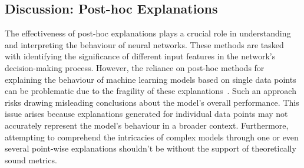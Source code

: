 

\subsection{Discussion: Post-hoc Explanations}
\label{lit:discussion}


The effectiveness of post-hoc explanations plays a crucial role in understanding and interpreting the behaviour of neural networks. These methods are tasked with identifying the significance of different input features in the network's decision-making process. However, the reliance on post-hoc methods for explaining the behaviour of machine learning models based on single data points can be problematic due to the fragility of these explanations~\cite{abs-1806-08049}. Such an approach risks drawing misleading conclusions about the model's overall performance. This issue arises because explanations generated for individual data points may not accurately represent the model's behaviour in a broader context. Furthermore, attempting to comprehend the intricacies of complex models through one or even several point-wise explanations shouldn't be without the support of theoretically sound metrics. 


